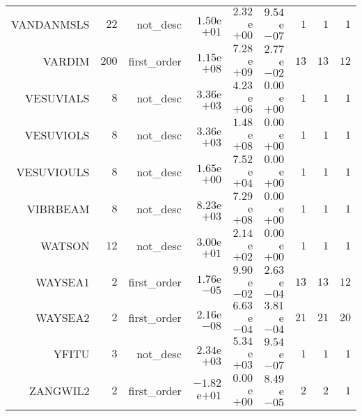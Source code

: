 \begin{longtable}{rrrrrrrrr}
VANDANMSLS & \(    22\) & not\_desc & \( 1.50\)e\(+01\) & \( 2.32\)e\(+00\) & \( 9.54\)e\(-07\) & \(     1\) & \(     1\) & \(     1\) \\
VARDIM & \(   200\) & first\_order & \( 1.15\)e\(+08\) & \( 7.28\)e\(+09\) & \( 2.77\)e\(-02\) & \(    13\) & \(    13\) & \(    12\) \\
VESUVIALS & \(     8\) & not\_desc & \( 3.36\)e\(+03\) & \( 4.23\)e\(+06\) & \( 0.00\)e\(+00\) & \(     1\) & \(     1\) & \(     1\) \\
VESUVIOLS & \(     8\) & not\_desc & \( 3.36\)e\(+03\) & \( 1.48\)e\(+08\) & \( 0.00\)e\(+00\) & \(     1\) & \(     1\) & \(     1\) \\
VESUVIOULS & \(     8\) & not\_desc & \( 1.65\)e\(+00\) & \( 7.52\)e\(+04\) & \( 0.00\)e\(+00\) & \(     1\) & \(     1\) & \(     1\) \\
VIBRBEAM & \(     8\) & not\_desc & \( 8.23\)e\(+03\) & \( 7.29\)e\(+08\) & \( 0.00\)e\(+00\) & \(     1\) & \(     1\) & \(     1\) \\
WATSON & \(    12\) & not\_desc & \( 3.00\)e\(+01\) & \( 2.14\)e\(+02\) & \( 0.00\)e\(+00\) & \(     1\) & \(     1\) & \(     1\) \\
WAYSEA1 & \(     2\) & first\_order & \( 1.76\)e\(-05\) & \( 9.90\)e\(-02\) & \( 2.63\)e\(-04\) & \(    13\) & \(    13\) & \(    12\) \\
WAYSEA2 & \(     2\) & first\_order & \( 2.16\)e\(-08\) & \( 6.63\)e\(-04\) & \( 3.81\)e\(-04\) & \(    21\) & \(    21\) & \(    20\) \\
YFITU & \(     3\) & not\_desc & \( 2.34\)e\(+03\) & \( 5.34\)e\(+03\) & \( 9.54\)e\(-07\) & \(     1\) & \(     1\) & \(     1\) \\
ZANGWIL2 & \(     2\) & first\_order & \(-1.82\)e\(+01\) & \( 0.00\)e\(+00\) & \( 8.49\)e\(-05\) & \(     2\) & \(     2\) & \(     1\) \\\hline
\end{longtable}

